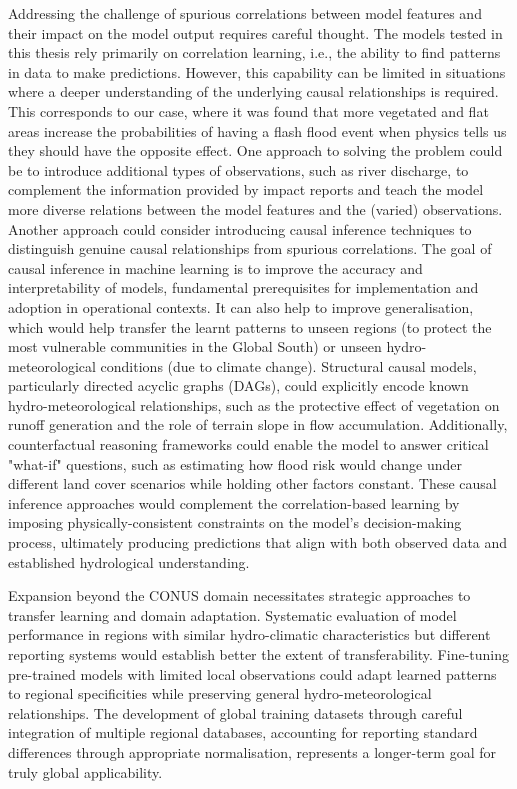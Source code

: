 Addressing the challenge of spurious correlations between model features and their impact on the model output requires careful thought. The models tested in this thesis rely primarily on correlation learning, i.e., the ability to find patterns in data to make predictions. However, this capability can be limited in situations where a deeper understanding of the underlying causal relationships is required. This corresponds to our case, where it was found that more vegetated and flat areas increase the probabilities of having a flash flood event when physics tells us they should have the opposite effect. One approach to solving the problem could be to introduce additional types of observations, such as river discharge, to complement the information provided by impact reports and teach the model more diverse relations between the model features and the (varied) observations. Another approach could consider introducing causal inference techniques to distinguish genuine causal relationships from spurious correlations. The goal of causal inference in machine learning is to improve the accuracy and interpretability of models, fundamental prerequisites for implementation and adoption in operational contexts. It can also help to improve generalisation, which would help transfer the learnt patterns to unseen regions (to protect the most vulnerable communities in the Global South) or unseen hydro-meteorological conditions (due to climate change). Structural causal models, particularly directed acyclic graphs (DAGs), could explicitly encode known hydro-meteorological relationships, such as the protective effect of vegetation on runoff generation and the role of terrain slope in flow accumulation. Additionally, counterfactual reasoning frameworks could enable the model to answer critical "what-if" questions, such as estimating how flood risk would change under different land cover scenarios while holding other factors constant. These causal inference approaches would complement the correlation-based learning by imposing physically-consistent constraints on the model's decision-making process, ultimately producing predictions that align with both observed data and established hydrological understanding.

Expansion beyond the CONUS domain necessitates strategic approaches to transfer learning and domain adaptation. Systematic evaluation of model performance in regions with similar hydro-climatic characteristics but different reporting systems would establish better the extent of transferability. Fine-tuning pre-trained models with limited local observations could adapt learned patterns to regional specificities while preserving general hydro-meteorological relationships. The development of global training datasets through careful integration of multiple regional databases, accounting for reporting standard differences through appropriate normalisation, represents a longer-term goal for truly global applicability.

